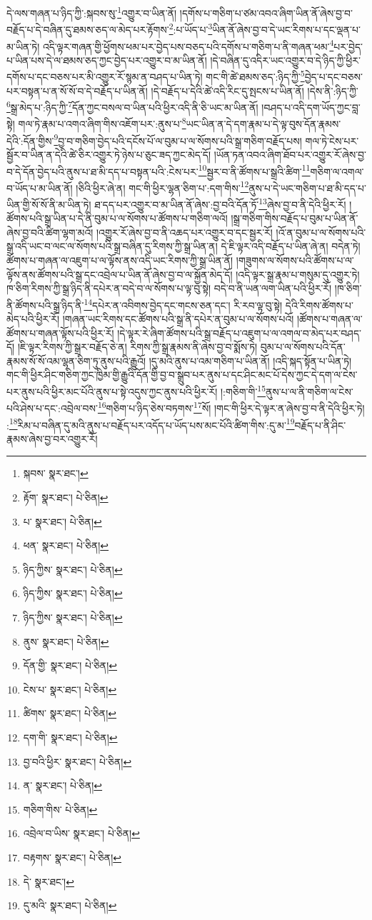 དེ་ལས་གཞན་པ་ཉིད་ཀྱི་:སྐབས་སུ་\footnote{སྐབས་  སྣར་ཐང་། }འགྱུར་བ་ཡིན་ནོ། །དགོས་པ་གཅིག་པ་ཙམ་འབའ་ཞིག་ཡིན་ནོ་ཞེས་བྱ་བ་བརྗོད་པ་དེ་བཞིན་དུ་ཐམས་ཅད་ལ་མེད་པར་རྟོགས་\footnote{རྟོག་  སྣར་ཐང་།  པེ་ཅིན། }:པ་ཡོད་པ་\footnote{པ་  སྣར་ཐང་།  པེ་ཅིན། }ཡིན་ནོ་ཞེས་བྱ་བ་དེ་ཡང་རིགས་པ་དང་ལྡན་པ་མ་ཡིན་ཏེ། འདི་ལྟར་གཞན་གྱི་ཕྱོགས་ཕམ་པར་བྱེད་པས་བཅད་པའི་དགོས་པ་གཅིག་པ་ནི་གཞན་ཕམ་\footnote{ཕན་  སྣར་ཐང་།  པེ་ཅིན། }པར་བྱེད་པ་ཡིན་པས་དེ་ལ་ཐམས་ཅད་ཀྱང་བྱེད་པར་འགྱུར་བ་མ་ཡིན་ནོ། །དེ་བཞིན་དུ་འདིར་ཡང་འགྱུར་བ་དེ་ཉིད་ཀྱི་ཕྱིར་དགོས་པ་དང་བཅས་པར་མི་འགྱུར་རོ་སྙམ་ན་བཤད་པ་ཡིན་ཏེ། གང་གི་ཚེ་ཐམས་ཅད་:ཉིད་ཀྱི་\footnote{ཉིད་ཀྱིས་  སྣར་ཐང་།  པེ་ཅིན། }བྱེད་པ་དང་བཅས་པར་བསྟན་པ་ན་སོ་སོ་བ་དེ་བརྗོད་པ་ཡིན་ནོ། །དེ་བརྗོད་པ་དེའི་ཚེ་འདི་རིང་དུ་སྤངས་པ་ཡིན་ནོ། །དེས་ནི་:ཉིད་ཀྱི་\footnote{ཉིད་ཀྱིས་  སྣར་ཐང་།  པེ་ཅིན། }སྒྲ་མེད་པ་:ཉིད་ཀྱི་\footnote{ཉིད་ཀྱིས་  སྣར་ཐང་།  པེ་ཅིན། }དོན་ཀྱང་བསལ་བ་ཡིན་པའི་ཕྱིར་འདི་ནི་ཅི་ཡང་མ་ཡིན་ནོ། །བཤད་པ་འདི་དག་ཡོད་ཀྱང་བླ་སྟེ། གལ་ཏེ་རྣམ་པ་འགའ་ཞིག་གིས་འཇོག་པར་:ནུས་པ་\footnote{ནུས་  སྣར་ཐང་།  པེ་ཅིན། }ཡང་ཡིན་ན་དེ་དག་རྣམ་པ་དེ་ལྟ་བུས་དོན་རྣམས་དེའི་:དོན་གྱིས་\footnote{དོན་གྱི་  སྣར་ཐང་།  པེ་ཅིན། }བྱ་བ་གཅིག་བྱེད་པའི་དངོས་པོ་ལ་བུམ་པ་ལ་སོགས་པའི་སྒྲ་གཅིག་བརྗོད་པས། གལ་ཏེ་ངེས་པར་སྦྱོར་བ་ཡིན་ན་དེའི་ཚེ་ཅིར་འགྱུར་ཏེ་ཉེས་པ་ཅུང་ཟད་ཀྱང་མེད་དོ། །ཡོན་ཏན་འབའ་ཞིག་ཐོབ་པར་འགྱུར་རོ་ཞེས་བྱ་བ་དེ་དོན་བྱེད་པའི་ནུས་པ་ཐ་མི་དད་པ་བསྟན་པའི་:ངེས་པར་\footnote{ངེས་པ་  སྣར་ཐང་།  པེ་ཅིན། }སྦྱར་བ་ནི་ཚོགས་པ་སྒྲའི་ཚིག་\footnote{ཚིགས་  སྣར་ཐང་།  པེ་ཅིན། }གཅིག་ལ་འགལ་བ་ཡོད་པ་མ་ཡིན་ནོ། །ཅིའི་ཕྱིར་ཞེ་ན། གང་གི་ཕྱིར་ལྷན་ཅིག་པ་:དག་གིས་\footnote{དག་གི་  སྣར་ཐང་།  པེ་ཅིན། }ནུས་པ་དེ་ཡང་གཅིག་པ་ཐ་མི་དད་པ་ཡིན་གྱི་སོ་སོ་ནི་མ་ཡིན་ཏེ། ཐ་དད་པར་འགྱུར་བ་མ་ཡིན་ནོ་ཞེས་:བྱ་བའི་དོན་ཏོ་\footnote{བྱ་བའི་ཕྱིར་  སྣར་ཐང་།  པེ་ཅིན། }ཞེས་བྱ་བ་ནི་དེའི་ཕྱིར་རོ། །ཚོགས་པའི་སྒྲ་ཡིན་པ་དེ་ནི་བུམ་པ་ལ་སོགས་པ་ཚོགས་པ་གཅིག་ལའོ། །སྒྲ་གཅིག་གིས་བརྗོད་པ་བུམ་པ་ཡིན་ནོ་ཞེས་བྱ་བའི་ཚིག་ལྷག་མའོ། །འགྱུར་རོ་ཞེས་བྱ་བ་ནི་འཆད་པར་འགྱུར་བ་དང་སྦྱར་རོ། །འོ་ན་བུམ་པ་ལ་སོགས་པའི་སྒྲ་འདི་ཡང་བ་ལང་ལ་སོགས་པའི་སྒྲ་བཞིན་དུ་རིགས་ཀྱི་སྒྲ་ཡིན་ན། དེ་ཇི་ལྟར་འདི་བརྗོད་པ་ཡིན་ཞེ་ན། བདེན་ཏེ། ཚོགས་པ་གཞན་ལ་འཇུག་པ་ལ་ལྟོས་ནས་འདི་ཡང་རིགས་ཀྱི་སྒྲ་ཡིན་ནོ། །གཟུགས་ལ་སོགས་པའི་ཚོགས་པ་ལ་ལྟོས་ནས་ཚོགས་པའི་སྒྲ་དང་འབྲེལ་པ་ཡིན་ནོ་ཞེས་བྱ་བ་ལ་སྐྱོན་མེད་དོ། །འདི་ལྟར་སྒྲ་རྣམ་པ་གསུམ་དུ་འགྱུར་ཏེ། ཁ་ཅིག་རིགས་ཀྱི་སྒྲ་ཉིད་ནི་དཔེར་ན་བདེ་བ་ལ་སོགས་པ་ལྟ་བུ་སྟེ། བདེ་བ་ནི་ཡན་ལག་ཡིན་པའི་ཕྱིར་རོ། །ཁ་ཅིག་ནི་ཚོགས་པའི་སྒྲ་ཉིད་ནི་\footnote{ན་  སྣར་ཐང་།  པེ་ཅིན། }དཔེར་ན་འབིགས་བྱེད་དང་གངས་ཅན་དང་། རི་རབ་ལྟ་བུ་སྟེ། དེའི་རིགས་ཚོགས་པ་མེད་པའི་ཕྱིར་རོ། །གཞན་ཡང་རིགས་དང་ཚོགས་པའི་སྒྲ་ནི་དཔེར་ན་བུམ་པ་ལ་སོགས་པའོ། །ཚོགས་པ་གཞན་ལ་ཚོགས་པ་གཞན་ལྟོས་པའི་ཕྱིར་རོ། །དེ་ལྟར་རེ་ཞིག་ཚོགས་པའི་སྒྲ་བརྗོད་པ་འཇུག་པ་ལ་འགལ་བ་མེད་པར་བཤད་དོ། །ཇི་ལྟར་རིགས་ཀྱི་སྒྲར་བརྗོད་ཅེ་ན། རིགས་ཀྱི་སྒྲ་རྣམས་ནི་ཞེས་བྱ་བ་སྨོས་ཏེ། བུམ་པ་ལ་སོགས་པའི་དོན་རྣམས་སོ་སོ་འམ་ལྷན་ཅིག་ཏུ་ནུས་པའི་རྒྱུའོ། །དུ་མའི་ནུས་པ་འམ་གཅིག་པ་ཡིན་ནོ། །འདི་སྐད་སྟོན་པ་ཡིན་ཏེ། གང་གི་ཕྱིར་ཤིང་གཅིག་ཀྱང་ཁྱིམ་གྱི་རྒྱུའི་དོན་གྱི་བྱ་བ་སྒྲུབ་པར་ནུས་པ་དང་ཤིང་མང་པོ་དེས་ཀྱང་དེ་དག་ལ་ངེས་པར་ནུས་པའི་ཕྱིར་མང་པོའི་ནུས་པ་སྟེ་འདུས་ཀྱང་ནུས་པའི་ཕྱིར་རོ། །:གཅིག་གི་\footnote{གཅིག་གིས་  པེ་ཅིན། }ནུས་པ་ལ་ནི་གཅིག་ལ་ངེས་པའི་ཤེས་པ་དང་:འབྲེལ་བས་\footnote{འབྲེལ་བ་ཡིས་  སྣར་ཐང་།  པེ་ཅིན། }གཅིག་པ་ཉིད་ཅེས་བཏགས་\footnote{བརྟགས་  སྣར་ཐང་།  པེ་ཅིན། }སོ། །གང་གི་ཕྱིར་དེ་ལྟར་ན་ཞེས་བྱ་བ་ནི་དེའི་ཕྱིར་ཏེ། :\footnote{དེ་  སྣར་ཐང་། }རིམ་པ་བཞིན་དུ་མའི་ནུས་པ་བརྗོད་པར་འདོད་པ་ཡོད་པས་མང་པོའི་ཚིག་གིས་:དུ་མ་\footnote{དུ་མའི་  སྣར་ཐང་།  པེ་ཅིན། }བརྗོད་པ་ནི་ཤིང་རྣམས་ཞེས་བྱ་བར་འགྱུར་རོ། 